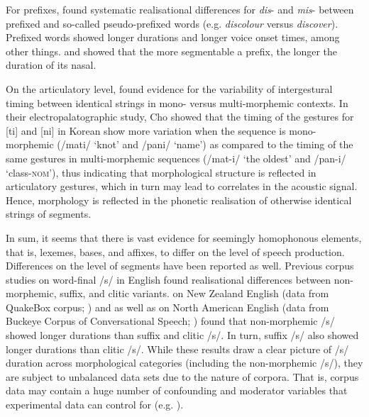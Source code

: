 For prefixes, \citet{Smith2012} found systematic realisational differences for \textit{dis}- and \textit{mis}- between prefixed and so-called pseudo-prefixed words (e.g. \textit{discolour} versus \textit{discover}). Prefixed words showed longer durations and longer voice onset times, among other things. \citet{BenHedia2017} and \citet{BenHedia2019} showed that the more segmentable a prefix, the longer the duration of its nasal.

On the articulatory level, \citet{Cho2001} found evidence for the variability of intergestural timing between identical strings in mono- versus multi-morphemic contexts. In their electropalatographic study, Cho showed that the timing of the gestures for [ti] and [ni] in Korean show more variation when the sequence is mono-morphemic (/mati/ ‘knot’ and /pani/ ‘name’) as compared to the timing of the same gestures in multi-morphemic sequences (/mat-i/ ‘the oldest’ and /pan-i/ ‘class-\textsc{nom}’), thus indicating that morphological structure is reflected in articulatory gestures, which in turn may lead to correlates in the acoustic signal. Hence, morphology is reflected in the phonetic realisation of otherwise identical strings of segments.

In sum, it seems that there is vast evidence for seemingly homophonous elements, that is, lexemes, bases, and affixes, to differ on the level of speech production. Differences on the level of segments have been reported as well. Previous corpus studies on word-final /s/ in English found realisational differences between non-morphemic, suffix, and clitic variants. \citet{Zimmermann2016} on New Zealand English (data from QuakeBox corpus; \cite{Walsh2013}) and \citet{Plag2017} as well as \citet{Tomaschek2019} on North American English (data from Buckeye Corpus of Conversational Speech; \cite{Pitt2007}) found that non-morphemic /s/ showed longer durations than suffix and clitic /s/. In turn, suffix /s/ also showed longer durations than clitic /s/. While these results draw a clear picture of /s/ duration across morphological categories (including the non-morphemic /s/), they are subject to unbalanced data sets due to the nature of corpora. That is, corpus data may contain a huge number of confounding and moderator variables that experimental data can control for (e.g. \cite{Gries2015}).

